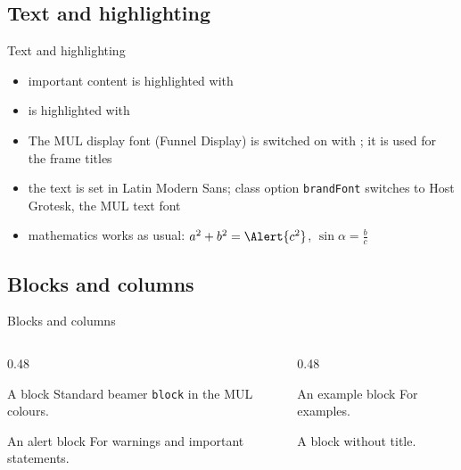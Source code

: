 \subsection{Text and highlighting}
\begin{frame}{Text and highlighting}
	\begin{itemize}[<1->]%
		\item \alert{important content} is highlighted with 
		\item {} is highlighted with 
		\item {\funneldisplay The MUL display font} (Funnel Display) is switched on with ; it is used for the frame titles
		\item the text is set in Latin Modern Sans; class option \texttt{brandFont} switches to Host Grotesk, the MUL text font
		\item mathematics works as usual: $a^2 + b^2 = \Alert{c^2}$, \quad $\sin\alpha = \frac{b}{c}$
	\end{itemize}
\end{frame}
%
\subsection{Blocks and columns}
\begin{frame}{Blocks and columns}
	\begin{columns}[T]
		\begin{column}{0.48\textwidth}
			\begin{block}{A block}
				Standard beamer \texttt{block} in the MUL colours.
			\end{block}
			\begin{alertblock}{An alert block}
				For warnings and important statements.
			\end{alertblock}
		\end{column}
		\begin{column}{0.48\textwidth}
			\begin{exampleblock}{An example block}
				For examples.
			\end{exampleblock}
			\begin{block}{}
				A block without title.
			\end{block}
		\end{column}
	\end{columns}
\end{frame}
%

